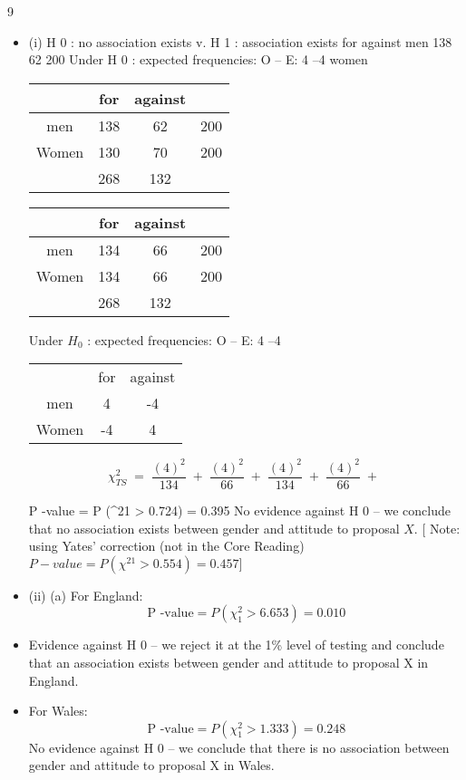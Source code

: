 \documentclass[a4paper,12pt]{article}
\begin{document}
\newpage
9
\begin{itemize}
\item (i)
H 0 : no association exists v. H 1 : association exists
for
against
men
138
62
200
Under H 0 : expected frequencies:
O – E:
4
–4
women


\begin{center}
\begin{tabular}{|c|c|c|c|}
    & for &  against &   \\ \hline
men &  138  & 62 &   200\\ \hline
Women & 130 & 70 & 200 \\
 & 268 & 132 & \\ 
\end{tabular}
\end{center}



\begin{center}
\begin{tabular}{|c|c|c|c|}
    & for &  against &   \\ \hline
men &  134  & 66 &   200\\ \hline
Women & 134 & 66 & 200 \\ \hline
 & 268 & 132 & \\ \hline
\end{tabular}
\end{center}


Under $H_0$ : expected frequencies:
O – E:
4
–4
\begin{center}
\begin{tabular}{ccc}
    & for &  against   \\
men & 4 & -4 \\
Women & -4 & 4 & \\

\end{tabular}
\end{center}


\[ \chi^2_{TS} \;=\; \frac{(4)^2}{134} \;+\; \frac{(4)^2}{66} \;+\; \frac{(4)^2}{134}  \;+\; \frac{(4)^2}{66} \;+\; \frac{}{} \]

P -value = P (\chi^21 > 0.724) = 0.395
No evidence against H 0 – we conclude that no association exists between gender and attitude to proposal $X$.
[ Note: using Yates’ correction (not in the Core Reading)
$P -value = P (\chi^21 > 0.554) = 0.457]$
\item (ii)
(a)
For England:
\[\mbox{P -value} = P ( \chi^{2}_{1} > 6.653) = 0.010\]
\item 
Evidence against H 0 – we reject it at the 1\% level of testing and conclude that an association exists between gender and attitude to
proposal X in England.
\item For Wales:
\[\mbox{P -value} = P ( \chi^{2}_{1} > 1.333) = 0.248\]
No evidence against H 0 – we conclude that there is no association
between gender and attitude to proposal X in Wales.


\end{itemize}
\end{document}
